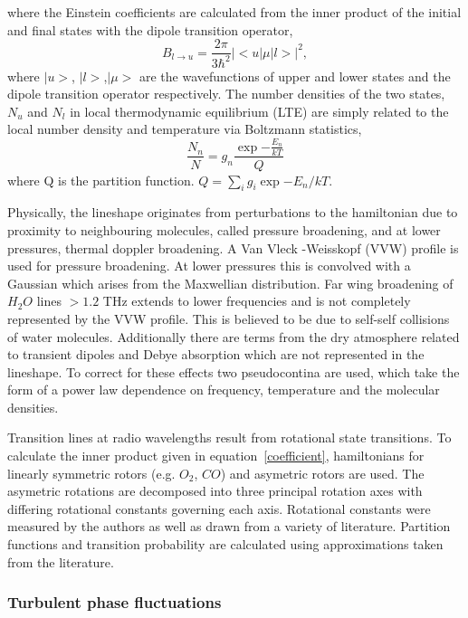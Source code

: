 \noindent where the Einstein coefficients are calculated from the inner product of the initial and final states with the dipole transition operator, 
\begin{equation}\label{coefficient}
B_{l \to u} = \frac{2\pi}{3\hbar^2} |<u|\mu|l>|^2,
\end{equation}
where $|u>$, $|l>$,$|\mu>$ are the wavefunctions of upper and lower states and the dipole transition operator respectively.
The number densities of the two states, $N_u$ and $N_l$ in local thermodynamic equilibrium (LTE) are simply related to the local number density and temperature via Boltzmann statistics,
\begin{equation}
\frac{N_n}{N} = g_n \frac {\exp{-\frac{E_n}{kT}}}{Q}
\end{equation}
where Q is the partition function. $Q = \sum_i g_i  \exp{-E_n/kT}$. 

Physically, the lineshape originates from perturbations to the hamiltonian due to proximity to neighbouring molecules, called pressure broadening, and at lower pressures, thermal doppler broadening. A Van Vleck -Weisskopf (VVW) profile is used for pressure broadening. At lower pressures this is convolved with a Gaussian which arises from the Maxwellian distribution. 
Far wing broadening of $H_2O$ lines $> 1.2$ THz extends to lower frequencies and is not completely represented by the VVW profile. This is believed to be due to self-self collisions of water molecules. Additionally there are terms from the dry atmosphere related to transient dipoles and Debye absorption which are not represented in the lineshape. To correct for these effects two pseudocontina are used, which take the form of a power law dependence on frequency, temperature and the molecular densities. 

Transition lines at radio wavelengths result from rotational state transitions. To calculate the inner product given in equation~\ref{coefficient}, hamiltonians for linearly symmetric rotors (e.g. $O_2$, $CO$) and asymetric rotors are used. The asymetric rotations are decomposed into three principal rotation axes with differing rotational constants governing each axis. Rotational constants were measured by the authors as well as drawn from a variety of literature. Partition functions and transition probability are calculated using approximations taken from the literature.


\subsubsection{Turbulent phase fluctuations}\label{sec:turb_theory}


